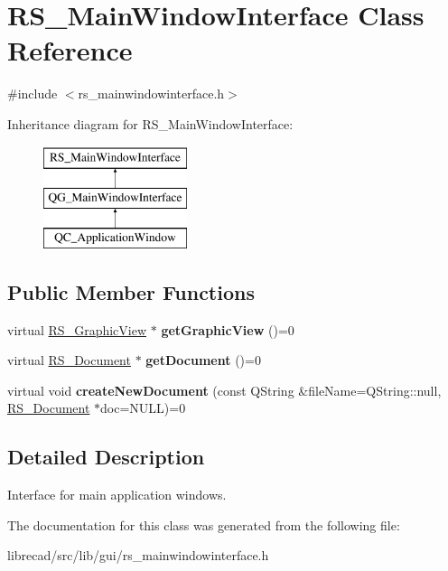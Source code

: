 \hypertarget{classRS__MainWindowInterface}{\section{R\-S\-\_\-\-Main\-Window\-Interface Class Reference}
\label{classRS__MainWindowInterface}
}


{\ttfamily \#include $<$rs\-\_\-mainwindowinterface.\-h$>$}

Inheritance diagram for R\-S\-\_\-\-Main\-Window\-Interface\-:\begin{figure}[H]
\begin{center}
\leavevmode
\includegraphics[height=3.000000cm]{classRS__MainWindowInterface}
\end{center}
\end{figure}
\subsection*{Public Member Functions}
\begin{DoxyCompactItemize}
\item 
\hypertarget{classRS__MainWindowInterface_aefb1e41e61686b59e67302f769336732}{virtual \hyperlink{classRS__GraphicView}{R\-S\-\_\-\-Graphic\-View} $\ast$ {\bfseries get\-Graphic\-View} ()=0}\label{classRS__MainWindowInterface_aefb1e41e61686b59e67302f769336732}

\item 
\hypertarget{classRS__MainWindowInterface_aca2ab0c35be8cb48c92b87fc73e61f77}{virtual \hyperlink{classRS__Document}{R\-S\-\_\-\-Document} $\ast$ {\bfseries get\-Document} ()=0}\label{classRS__MainWindowInterface_aca2ab0c35be8cb48c92b87fc73e61f77}

\item 
\hypertarget{classRS__MainWindowInterface_a95924854ef808182b4d20023610a35fa}{virtual void {\bfseries create\-New\-Document} (const Q\-String \&file\-Name=Q\-String\-::null, \hyperlink{classRS__Document}{R\-S\-\_\-\-Document} $\ast$doc=N\-U\-L\-L)=0}\label{classRS__MainWindowInterface_a95924854ef808182b4d20023610a35fa}

\end{DoxyCompactItemize}


\subsection{Detailed Description}
Interface for main application windows. 

The documentation for this class was generated from the following file\-:\begin{DoxyCompactItemize}
\item 
librecad/src/lib/gui/rs\-\_\-mainwindowinterface.\-h\end{DoxyCompactItemize}
